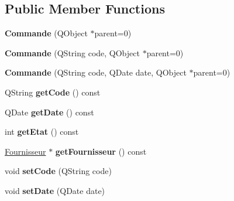 \subsection*{Public Member Functions}
\begin{DoxyCompactItemize}
\item 
\hypertarget{class_commande_ad68950904e104bde06bf10569871873f}{
{\bfseries Commande} (QObject $\ast$parent=0)}
\label{da/de7/class_commande_ad68950904e104bde06bf10569871873f}

\item 
\hypertarget{class_commande_a6a041d58081e667a7894c0be35f09792}{
{\bfseries Commande} (QString code, QObject $\ast$parent=0)}
\label{da/de7/class_commande_a6a041d58081e667a7894c0be35f09792}

\item 
\hypertarget{class_commande_a9133e616904f1de107284a92d0dcd1ec}{
{\bfseries Commande} (QString code, QDate date, QObject $\ast$parent=0)}
\label{da/de7/class_commande_a9133e616904f1de107284a92d0dcd1ec}

\item 
\hypertarget{class_commande_a15435c7ea66fb31a2a688ccb42db1532}{
QString {\bfseries getCode} () const }
\label{da/de7/class_commande_a15435c7ea66fb31a2a688ccb42db1532}

\item 
\hypertarget{class_commande_ab637d39c6cd62a8c35ab4d935b3e8be8}{
QDate {\bfseries getDate} () const }
\label{da/de7/class_commande_ab637d39c6cd62a8c35ab4d935b3e8be8}

\item 
\hypertarget{class_commande_aa71c200197a231744d161b01d4c4cd73}{
int {\bfseries getEtat} () const }
\label{da/de7/class_commande_aa71c200197a231744d161b01d4c4cd73}

\item 
\hypertarget{class_commande_a22acedca2cfbfe5ac3350d119345bba9}{
\hyperlink{class_fournisseur}{Fournisseur} $\ast$ {\bfseries getFournisseur} () const }
\label{da/de7/class_commande_a22acedca2cfbfe5ac3350d119345bba9}

\item 
\hypertarget{class_commande_a154042e09feeb5fc11d2dae893481e73}{
void {\bfseries setCode} (QString code)}
\label{da/de7/class_commande_a154042e09feeb5fc11d2dae893481e73}

\item 
\hypertarget{class_commande_a0b3188df4367fd7366e82415c8b1f8c1}{
void {\bfseries setDate} (QDate date)}
\label{da/de7/class_commande_a0b3188df4367fd7366e82415c8b1f8c1}


\end{DoxyCompactItemize}
